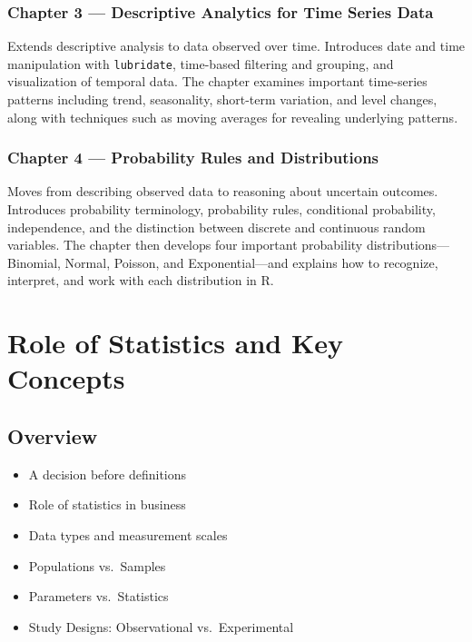 \documentclass[
  letterpaper,
  DIV=11,
  numbers=noendperiod]{scrreprt}
\providecommand{\tightlist}{%
  \setlength{\itemsep}{0pt}\setlength{\parskip}{0pt}}
\begin{document}
\subsection*{Chapter 3 --- Descriptive Analytics for Time Series
Data}\label{chapter-3-descriptive-analytics-for-time-series-data}

Extends descriptive analysis to data observed over time. Introduces date
and time manipulation with \texttt{lubridate}, time-based filtering and
grouping, and visualization of temporal data. The chapter examines
important time-series patterns including trend, seasonality, short-term
variation, and level changes, along with techniques such as moving
averages for revealing underlying patterns.

\subsection*{Chapter 4 --- Probability Rules and
Distributions}\label{chapter-4-probability-rules-and-distributions}

Moves from describing observed data to reasoning about uncertain
outcomes. Introduces probability terminology, probability rules,
conditional probability, independence, and the distinction between
discrete and continuous random variables. The chapter then develops four
important probability distributions---Binomial, Normal, Poisson, and
Exponential---and explains how to recognize, interpret, and work with
each distribution in R.


\chapter{Role of Statistics and Key
Concepts}\label{role-of-statistics-and-key-concepts}

\section{Overview}\label{overview}

\begin{itemize}
\tightlist
\item
  A decision before definitions
\item
  Role of statistics in business
\item
  Data types and measurement scales
\item
  Populations vs.~Samples
\item
  Parameters vs.~Statistics
\item
  Study Designs: Observational vs.~Experimental
\end{itemize}
\end{document}
